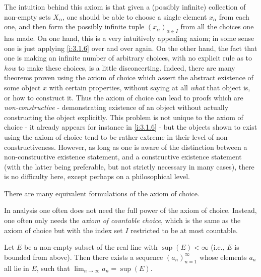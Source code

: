 \begin{rmk}\label{i:8.4.3}
  The intuition behind this axiom is that given a (possibly infinite) collection of non-empty sets \(X_{\alpha}\), one should be able to choose a single element \(x_{\alpha}\) from each one, and then form the possibly infinite tuple \((x_{\alpha})_{\alpha \in I}\) from all the choices one has made.
  On one hand, this is a very intuitively appealing axiom;
  in some sense one is just applying \cref{i:3.1.6} over and over again.
  On the other hand, the fact that one is making an infinite number of arbitrary choices, with no explicit rule as to \emph{how} to make these choices, is a little disconcerting.
  Indeed, there are many theorems proven using the axiom of choice which assert the abstract existence of some object \(x\) with certain properties, without saying at all \emph{what} that object is, or how to construct it.
  Thus the axiom of choice can lead to proofs which are \emph{non-constructive} - demonstrating existence of an object without actually constructing the object explicitly.
  This problem is not unique to the axiom of choice - it already appears for instance in \cref{i:3.1.6} - but the objects shown to exist using the axiom of choice tend to be rather extreme in their level of non-constructiveness.
  However, as long as one is aware of the distinction between a non-constructive existence statement, and a constructive existence statement (with the latter being preferable, but not strictly necessary in many cases), there is no difficulty here, except perhaps on a philosophical level.
\end{rmk}

\begin{rmk}\label{i:8.4.4}
  There are many equivalent formulations of the axiom of choice.
\end{rmk}

\begin{note}
  In analysis one often does not need the full power of the axiom of choice.
  Instead, one often only needs the \emph{axiom of countable choice}, which is the same as the axiom of choice but with the index set \(I\) restricted to be at most countable.
\end{note}

\begin{lem}\label{i:8.4.5}
  Let \(E\) be a non-empty subset of the real line with \(\sup(E) < \infty\)
  (i.e., \(E\) is bounded from above).
  Then there exists a sequence \((a_n)_{n = 1}^\infty\) whose elements \(a_n\) all lie in \(E\), such that \(\lim_{n \to \infty} a_n = \sup(E)\).
\end{lem}

